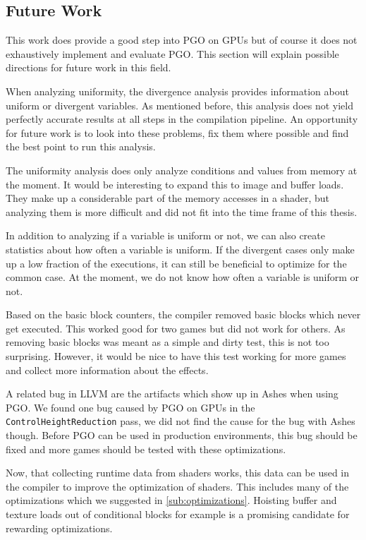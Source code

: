 \subsection{Future Work}
\label{sub:futurework}
This work does provide a good step into PGO on GPUs but of course it does not exhaustively implement and evaluate PGO.
This section will explain possible directions for future work in this field.

When analyzing uniformity, the divergence analysis provides information about uniform or divergent variables.
As mentioned before, this analysis does not yield perfectly accurate results at all steps in the compilation pipeline.
An opportunity for future work is to look into these problems, fix them where possible and find the best point to run this analysis.

The uniformity analysis does only analyze conditions and values from memory at the moment.
It would be interesting to expand this to image and buffer loads.
They make up a considerable part of the memory accesses in a shader, but analyzing them is more difficult and did not fit into the time frame of this thesis.

In addition to analyzing if a variable is uniform or not, we can also create statistics about how often a variable is uniform.
If the divergent cases only make up a low fraction of the executions, it can still be beneficial to optimize for the common case.
At the moment, we do not know how often a variable is uniform or not.

Based on the basic block counters, the compiler removed basic blocks which never get executed.
This worked good for two games but did not work for others.
As removing basic blocks was meant as a simple and dirty test, this is not too surprising.
However, it would be nice to have this test working for more games and collect more information about the effects.

A related bug in LLVM are the artifacts which show up in Ashes when using PGO.
We found one bug caused by PGO on GPUs in the \texttt{ControlHeightReduction} pass, we did not find the cause for the bug with Ashes though.
Before PGO can be used in production environments, this bug should be fixed and more games should be tested with these optimizations.

Now, that collecting runtime data from shaders works, this data can be used in the compiler to improve the optimization of shaders.
This includes many of the optimizations which we suggested in \cref{sub:optimizations}.
Hoisting buffer and texture loads out of conditional blocks for example is a promising candidate for rewarding optimizations.

